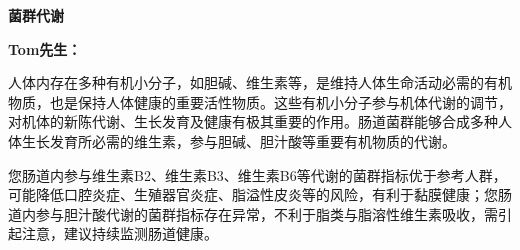 

\usepackage{graphicx}
\graphicspath{{cores/}}



\setlength{\arrayrulewidth}{0.5pt}
\fontsize{9.3pt}{17pt}\selectfont
\color{gray2}

\vspace*{0mm}
\begin{center}
{\bf\sanhao 菌群代谢}
\end{center}

\medskip
\noindent
{\bf\xiaosihao Tom先生：}

\bigskip

人体内存在多种有机小分子，如胆碱、维生素等，是维持人体生命活动必需的有机物质，也是保持人体健康的重要活性物质。这些有机小分子参与机体代谢的调节，对机体的新陈代谢、生长发育及健康有极其重要的作用。肠道菌群能够合成多种人体生长发育所必需的维生素，参与胆碱、胆汁酸等重要有机物质的代谢。

您肠道内参与维生素B2、维生素B3、维生素B6等代谢的菌群指标优于参考人群，可能降低口腔炎症、生殖器官炎症、脂溢性皮炎等的风险，有利于黏膜健康；您肠道内参与胆汁酸代谢的菌群指标存在异常，不利于脂类与脂溶性维生素吸收，需引起注意，建议持续监测肠道健康。

